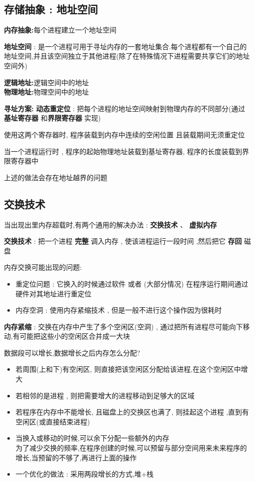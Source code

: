 \documentclass[UTF8,a4paper]{ctexart}
\newcommand{\spaceline}{\vspace{\baselineskip}}
\begin{document}
\subsection{存储抽象 : 地址空间}
\textbf{内存抽象:}每个进程建立一个地址空间

\textbf{地址空间} : 是一个进程可用于寻址内存的一套地址集合.每个进程都有一个自己的地址空间,并且该空间独立于其他进程(除了在特殊情况下进程需要共享它们的地址空间外)

\textbf{逻辑地址:}逻辑空间中的地址\\
\textbf{物理地址:}物理空间中的地址

\spaceline\textbf{寻址方案:}
\textbf{动态重定位} : 把每个进程的地址空间映射到物理内存的不同部分(通过 \textbf{基址寄存器}  和\textbf{界限寄存器} 实现)

使用这两个寄存器时, 程序装载到内存中连续的空闲位置 且装载期间无须重定位

当一个进程运行时 , 程序的起始物理地址装载到基址寄存器, 程序的长度装载到界限寄存器中

上述的做法会存在地址越界的问题

\subsection{交换技术}
当出现出里内存超载时,有两个通用的解决办法 :
\textbf{交换技术} 、 \textbf{虚拟内存}

\textbf{交换技术} : 把一个进程 \textbf{完整} 调入内存 , 使该进程运行一段时间 ,然后把它 \textbf{存回} 磁盘

内存交换可能出现的问题:
\begin{itemize}
	\item 重定位问题 :
	      它换入的时候通过软件 或者 (大部分情况) 在程序运行期间通过硬件对其地址进行重定位
	\item 内存空洞 : 使用内存紧缩技术 , 但是一般不进行这个操作因为很耗时
\end{itemize}

\textbf{内存紧缩} : 交换在内存中产生了多个空闲区(空洞) , 通过把所有进程尽可能向下移动,有可能把这些小的空闲区合并成一大块

数据段可以增长,数据增长之后内存怎么分配?
\begin{itemize}
	\item 若周围(上和下)有空闲区, 则直接把该空闲区分配给该进程,在这个空闲区中增大
	\item 若相邻的是进程 , 则把需要增大的进程移动到足够大的区域
	\item 若程序在内存中不能增长, 且磁盘上的交换区也满了, 则挂起这个进程 ,直到有空闲区(或直接结束进程)
	\item 当换入或移动的时候,可以余下分配一些额外的内存 \\
	      为了减少交换的频率,在程序创建的时候,可以预留与部分空间用来未来程序的增长,当预留的不够了,再进行上面的操作
	\item 一个优化的做法 : 采用两段增长的方式,堆+栈
\end{itemize}
\end{document}
